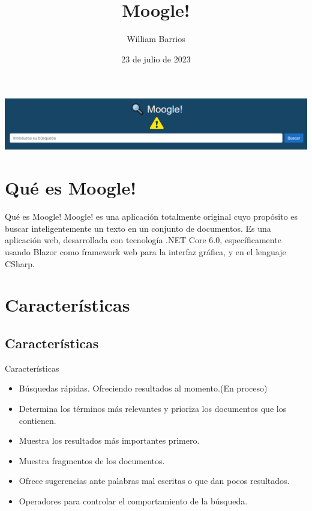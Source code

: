 \documentclass{beamer}
\title{Moogle!}
\author{William Barrios}
\date{23 de julio de 2023}
\begin{document}
\begin{titlepage}

   \begin{center}
    \includegraphics[scale=0.25]{Imagenes/moogle.png}
   \end{center}

\end{titlepage}

\centering

\section{Qué es Moogle!}

\begin{frame}{Qué es Moogle!}
    Moogle! es una aplicación totalmente original cuyo propósito es buscar inteligentemente un texto en un conjunto de documentos. Es una aplicación web, desarrollada con tecnología .NET Core 6.0, específicamente usando Blazor como framework web para la interfaz gráfica, y en el lenguaje CSharp.
\end{frame}


\section{Características}

\subsection{Características}

\begin{frame}{Características}

    \begin{itemize}
        \item<1-> Búsquedas rápidas. Ofreciendo resultados al momento.(En proceso)
        \item<2-> Determina los términos más relevantes y prioriza los documentos que los contienen.
        \item<3-> Muestra los resultados más importantes primero.
        \item<4-> Muestra fragmentos de los documentos.
        \item<5-> Ofrece sugerencias ante palabras mal escritas o que dan pocos resultados.
        \item<6-> Operadores para controlar el comportamiento de la búsqueda.
    \end{itemize}

\end{frame}
\end{document}
